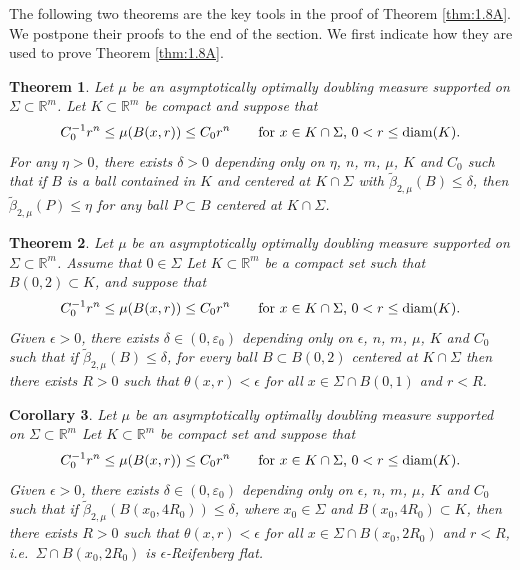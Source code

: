 \documentclass[12pt,leqno]{article}
\newcommand{\diam}{{\rm diam}}
\newcommand{\wt}[1]{{\widetilde{#1}}}
\newcommand{\RR}{\mathbb{R}}
\newcommand{\ve}{{\varepsilon}}
\theoremstyle{plain}
\newtheorem{thm}{Theorem}[section]
\newtheorem{cor}[thm]{Corollary}
\numberwithin{equation}{section}
\begin{document}
The following two theorems are the key tools in the proof of
Theorem \ref{thm:1.8A}. We postpone their proofs to the end of the section.
We first indicate how they are used to prove Theorem \ref{thm:1.8A}.

\begin{thm}\label{mth}
Let $\mu$ be an asymptotically optimally doubling measure supported on
$\Sigma\subset\RR^m$.
Let $K\subset\RR^m$ be compact and suppose that
\begin{equation}\label{eqn:04.1}
C_0^{-1}r^n\leq \mu(B(x,r))\leq C_0r^n\qquad\mbox{for $x\in
K\cap\Sigma$, $0<r\leq\diam(K)$}.
\end{equation}
For any $\eta>0$, there exists $\delta>0$ depending only on $\eta$, $n$, $m$,
$\mu$, $K$ and  $C_0$ such that if $B$ is a ball contained in $K$
and centered at $K\cap\Sigma$ with
$\wt\beta_{2,\mu}(B)\leq\delta$, then $\wt\beta_{2,\mu}(P)\leq\eta$
for any ball $P\subset B$ centered at $K\cap\Sigma$.
\end{thm}

\begin{thm}\label{b2t}
Let $\mu$ be an asymptotically optimally doubling measure supported on
$\Sigma\subset\RR^m$. Assume that $0\in \Sigma$
Let $K\subset\RR^m$ be a compact set such that $B(0,2)\subset K$, and
suppose that
\begin{equation}\label{eqn:04.2}
C_0^{-1}r^n\leq \mu(B(x,r))\leq C_0r^n\qquad\mbox{for $x\in
K\cap\Sigma$, $0<r\leq\diam(K)$}.
\end{equation}
Given $\epsilon>0$, there exists $\delta\in (0,\ve_0)$ depending only on
$\epsilon$, $n$, $m$, $\mu$, $K$ and  $C_0$ such that if
$\wt\beta_{2,\mu}(B)\leq\delta$,
for every ball $B\subset B(0,2)$ centered at $K\cap\Sigma$ then there exists
$R>0$ such that $\theta (x,r)<\epsilon$ for all $x\in \Sigma\cap B(0,1)$ and
$r<R$.
\end{thm}


\begin{cor}\label{cort}
Let $\mu$ be an asymptotically optimally doubling measure supported on
$\Sigma\subset\RR^m$
Let $K\subset\RR^m$ be compact set and suppose that
\begin{equation}\label{eqn:04.3}
C_0^{-1}r^n\leq \mu(B(x,r))\leq C_0r^n\qquad\mbox{for $x\in
K\cap\Sigma$, $0<r\leq\diam(K)$}.
\end{equation}
Given $\epsilon>0$, there exists $\delta\in (0,\ve_0)$ depending only on
$\epsilon$, $n$, $m$, $\mu$, $K$ and  $C_0$ such that if
$\wt\beta_{2,\mu}(B(x_0, 4R_0))\leq\delta$,
where $x_0\in \Sigma$  and $B(x_0, 4R_0)\subset K$, then there exists
$R>0$ such that $\theta (x,r)<\epsilon$ for all $x\in \Sigma\cap B(x_0,2R_0)$
and $r<R$, i.e.\ $\Sigma\cap B(x_0, 2R_0)$ is $\epsilon$-Reifenberg flat.
\end{cor}
\end{document}
